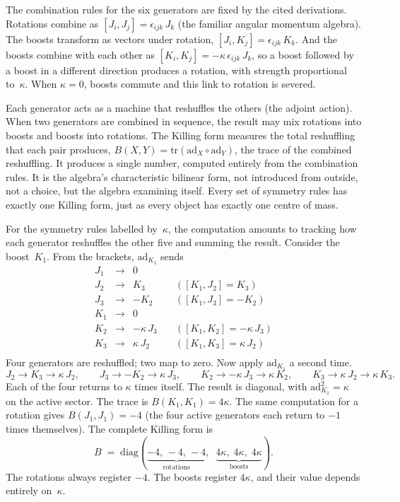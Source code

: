 \documentclass[11pt]{article}
\begin{document}
The combination rules for the six generators are fixed by the cited derivations. Rotations combine as $[J_i, J_j] = \epsilon_{ijk}\,J_k$ (the familiar angular momentum algebra). The boosts transform as vectors under rotation, $[J_i, K_j] = \epsilon_{ijk}\,K_k$. And the boosts combine with each other as $[K_i, K_j] = -\kappa\,\epsilon_{ijk}\,J_k$, so a boost followed by a boost in a different direction produces a rotation, with strength proportional to~$\kappa$. When $\kappa = 0$, boosts commute and this link to rotation is severed.

Each generator acts as a machine that reshuffles the others (the adjoint action). When two generators are combined in sequence, the result may mix rotations into boosts and boosts into rotations. The Killing form measures the total reshuffling that each pair produces, $B(X,Y) = \mathrm{tr}(\mathrm{ad}_X \circ \mathrm{ad}_Y)$, the trace of the combined reshuffling. It produces a single number, computed entirely from the combination rules. It is the algebra's characteristic bilinear form, not introduced from outside, not a choice, but the algebra examining itself. Every set of symmetry rules has exactly one Killing form, just as every object has exactly one centre of mass.

For the symmetry rules labelled by~$\kappa$, the computation amounts to tracking how each generator reshuffles the other five and summing the result. Consider the boost~$K_1$. From the brackets, $\mathrm{ad}_{K_1}$ sends
\[
\begin{array}{rcll}
J_1 &\to& 0 \\
J_2 &\to& K_3 &\quad ([K_1, J_2] = K_3) \\
J_3 &\to& -K_2 &\quad ([K_1, J_3] = -K_2) \\
K_1 &\to& 0 \\
K_2 &\to& -\kappa\,J_3 &\quad ([K_1, K_2] = -\kappa\,J_3) \\
K_3 &\to& \kappa\,J_2 &\quad ([K_1, K_3] = \kappa\,J_2) \\
\end{array}
\]
Four generators are reshuffled; two map to zero. Now apply $\mathrm{ad}_{K_1}$ a second time.
\[
J_2 \to K_3 \to \kappa\,J_2, \qquad
J_3 \to -K_2 \to \kappa\,J_3, \qquad
K_2 \to -\kappa\,J_3 \to \kappa\,K_2, \qquad
K_3 \to \kappa\,J_2 \to \kappa\,K_3.
\]
Each of the four returns to $\kappa$ times itself. The result is diagonal, with $\mathrm{ad}_{K_1}^2 = \kappa$ on the active sector. The trace is $B(K_1, K_1) = 4\kappa$. The same computation for a rotation gives $B(J_1, J_1) = -4$ (the four active generators each return to $-1$ times themselves). The complete Killing form is
\[
B \;=\; \mathrm{diag}(\underbrace{-4,\,-4,\,-4}_{\text{rotations}},\;\; \underbrace{4\kappa,\;4\kappa,\;4\kappa}_{\text{boosts}}).
\]
The rotations always register $-4$. The boosts register $4\kappa$, and their value depends entirely on~$\kappa$.
\end{document}
